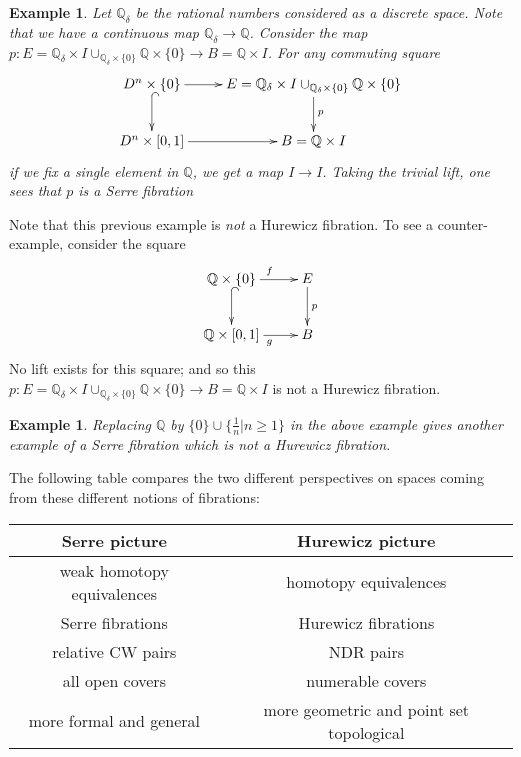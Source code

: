 \documentclass{article}
\newtheorem{example}[theorem]{Example}
\newtheorem{proposed work}[theorem]{Proposed Work}
\newcommand{\xymat}[1]{\begin{align*}\xymatrix{ #1}\end{align*}}
\begin{document}
\begin{example}
Let $\mathbb{Q}_\delta$ be the rational numbers considered as a discrete space. Note that we have a continuous map $\mathbb{Q}_\delta\to \mathbb{Q}$. Consider the map $p:E=\mathbb{Q}_\delta\times I\cup_{\mathbb{Q}_\delta\times \lbrace 0\rbrace} \mathbb{Q}\times \lbrace 0\rbrace \to B=\mathbb{Q}\times I$. For any commuting square 
\xymat{D^n\times \lbrace 0\rbrace \ar[r] \ar@{^{(}->}[d] & E=\mathbb{Q}_\delta\times I\cup_{\mathbb{Q}_\delta\times \lbrace 0\rbrace} \mathbb{Q}\times \lbrace 0\rbrace \ar[d]^p \\ D^n\times [0,1] \ar[r] & B=\mathbb{Q}\times I} if we fix a single element in $\mathbb{Q}$, we get a map $I\to I$.
Taking the trivial lift, one sees that $p$ is a Serre fibration
\end{example}
Note that this previous example is \textit{not} a Hurewicz fibration. To see a counter-example, consider the square
\xymat{\mathbb{Q}\times \lbrace 0\rbrace \ar[r]^f \ar@{^{(}->}[d] & E \ar[d]^p \\ \mathbb{Q}\times [0,1] \ar[r]_g & B}
No lift exists for this square; and so this $p:E=\mathbb{Q}_\delta\times I\cup_{\mathbb{Q}_\delta\times \lbrace 0\rbrace} \mathbb{Q}\times \lbrace 0\rbrace \to B=\mathbb{Q}\times I$ is not a Hurewicz fibration.
\begin{example}
Replacing $\mathbb{Q}$ by $\lbrace 0 \rbrace \cup \lbrace \frac{1}{n}|n\geq 1\rbrace$ in the above example gives another example of a Serre fibration which is not a Hurewicz fibration. 
\end{example}
The following table compares the two different perspectives on spaces coming from these different notions of fibrations:\\

\begin{tabular}{|c|c|}
\hline 
\textbf{Serre picture} & \textbf{Hurewicz picture} \\ 
\hline 
weak homotopy equivalences & homotopy equivalences \\ 
\hline 
Serre fibrations & Hurewicz fibrations \\ 
\hline 
relative CW pairs & NDR pairs \\ 
\hline 
all open covers & numerable covers \\ 
\hline 
more formal and general & more geometric and point set topological \\ 
\hline 
\end{tabular} 
\end{document}
